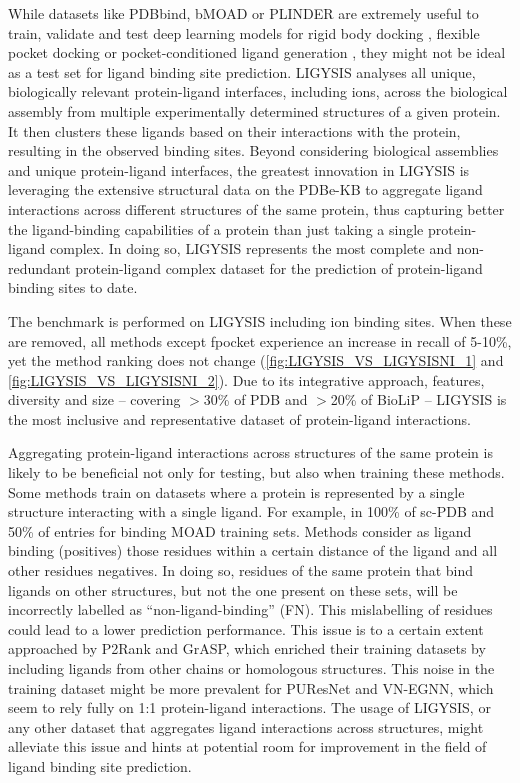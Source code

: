 While datasets like PDBbind, bMOAD or PLINDER \cite{DURAIRAJ_2024_PLINDER} are extremely useful to train, validate and test deep learning models for rigid body docking \cite{STARK_2022_EQUIBIND}, flexible pocket docking \cite{QIAO_2024_DGN} or pocket-conditioned ligand generation \cite{SCHNEUING_2024_DIFFUSION}, they might not be ideal as a test set for ligand binding site prediction. LIGYSIS analyses all unique, biologically relevant protein-ligand interfaces, including ions, across the biological assembly from multiple experimentally determined structures of a given protein. It then clusters these ligands based on their interactions with the protein, resulting in the observed binding sites. Beyond considering biological assemblies and unique protein-ligand interfaces, the greatest innovation in LIGYSIS is leveraging the extensive structural data on the PDBe-KB to aggregate ligand interactions across different structures of the same protein, thus capturing better the ligand-binding capabilities of a protein than just taking a single protein-ligand complex. In doing so, LIGYSIS represents the most complete and non-redundant protein-ligand complex dataset for the prediction of protein-ligand binding sites to date.

The benchmark is performed on LIGYSIS including ion binding sites. When these are removed, all methods except fpocket experience an increase in recall of 5-10\%, yet the method ranking does not change (\autoref{fig:LIGYSIS_VS_LIGYSISNI_1} and \autoref{fig:LIGYSIS_VS_LIGYSISNI_2}). Due to its integrative approach, features, diversity and size -- covering $>$30\% of PDB and $>$20\% of BioLiP -- LIGYSIS is the most inclusive and representative dataset of protein-ligand interactions.

Aggregating protein-ligand interactions across structures of the same protein is likely to be beneficial not only for testing, but also when training these methods. Some methods train on datasets where a protein is represented by a single structure interacting with a single ligand. For example, in 100\% of sc-PDB and 50\% of entries for binding MOAD training sets. Methods consider as ligand binding (positives) those residues within a certain distance of the ligand and all other residues negatives. In doing so, residues of the same protein that bind ligands on other structures, but not the one present on these sets, will be incorrectly labelled as ``non-ligand-binding'' (FN). This mislabelling of residues could lead to a lower prediction performance. This issue is to a certain extent approached by P2Rank and GrASP, which enriched their training datasets by including ligands from other chains or homologous structures. This noise in the training dataset might be more prevalent for PUResNet and VN-EGNN, which seem to rely fully on 1:1 protein-ligand interactions. The usage of LIGYSIS, or any other dataset that aggregates ligand interactions across structures, might alleviate this issue and hints at potential room for improvement in the field of ligand binding site prediction.


